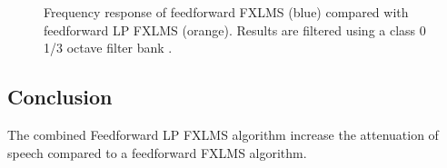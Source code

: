 \begin{figure}[H]
	\centering
	
	\caption{Frequency response of feedforward FXLMS (blue) compared with feedforward LP FXLMS (orange). Results are filtered using a class 0 1/3 octave filter bank \cite{OctaveBand}.}
	\label{fig:ANCcompareALLAppendix}
\end{figure}


\subsection{Conclusion}
The combined Feedforward LP FXLMS algorithm increase the attenuation of speech compared to a feedforward FXLMS algorithm. 
